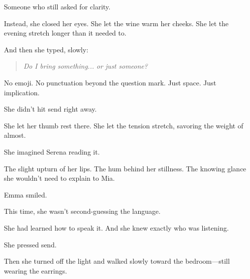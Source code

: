 Someone who still asked for clarity.

Instead, she closed her eyes. She let the wine warm her cheeks. She let the evening stretch 
longer than it needed to.

And then she typed, slowly:

\begin{quote}
\textit{Do I bring something... or just someone?}
\end{quote}

No emoji.
No punctuation beyond the question mark.
Just space.
Just implication.

She didn’t hit send right away.

She let her thumb rest there.
She let the tension stretch, savoring the weight of almost.

She imagined Serena reading it.

The slight upturn of her lips.
The hum behind her stillness.
The knowing glance she wouldn’t need to explain to Mia.

Emma smiled.

This time, she wasn’t second-guessing the language.

She had learned how to speak it.
And she knew exactly who was listening.

She pressed send.

Then she turned off the light and walked slowly toward the bedroom—still wearing the earrings.

\medskip

